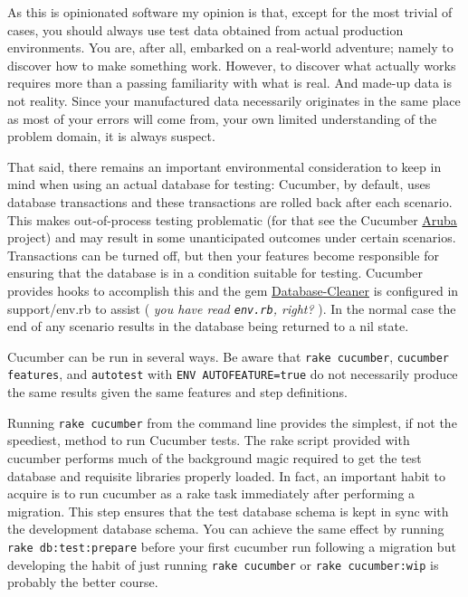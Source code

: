 As this is opinionated software my opinion is that, except for the most trivial of cases, you should always use test data obtained from actual production environments.  You are, after all, embarked on a real-world adventure; namely to discover how to make something work.  However, to discover what actually works requires more than a passing familiarity with what is real.  And made-up data is not reality.  Since your manufactured data necessarily originates in the same place as most of your errors will come from, your own limited understanding of the problem domain, it is always suspect.

That said, there remains an important environmental consideration to keep in mind when using an actual database for testing: Cucumber, by default, uses database transactions and these transactions are rolled back after each scenario.  This makes out-of-process testing problematic (for that see the Cucumber \href{http://github.com/cucumber/aruba}{Aruba} project)  and may result in some unanticipated outcomes under certain scenarios.  Transactions can be turned off, but then your features become responsible for ensuring that the database is in a condition suitable for testing.  Cucumber provides hooks to accomplish this and the gem \href{http://github.com/bmabey/database_cleaner}{Database-Cleaner} is configured in support/env.rb to assist ( \emph{you have read \verb+env.rb+, right?} ). In the normal case the end of any scenario results in the database being returned to a nil state.

Cucumber can be run in several ways.  Be aware that \verb+rake cucumber+, \verb+cucumber features+, and \verb+autotest+ with \verb+ENV AUTOFEATURE=true+ do not necessarily produce the same results given the same features and step definitions.

Running \verb+rake cucumber+ from the command line provides the simplest, if not the speediest, method to run Cucumber tests. The rake script provided with cucumber performs much of the background magic required to get the test database and requisite libraries properly loaded.  In fact, an important habit to acquire is to run cucumber as a rake task immediately after performing a migration.  This step ensures that the test database schema is kept in sync with the development database schema.  You can achieve the same effect by running \verb+rake db:test:prepare+ before your first cucumber run following a migration but developing the habit of just running \verb+rake cucumber+ or \verb+rake cucumber:wip+ is probably the better course.

